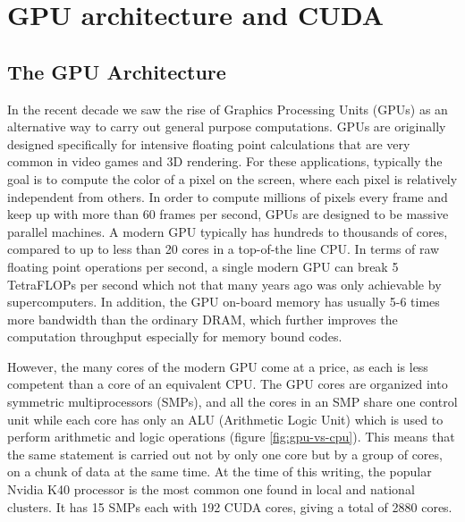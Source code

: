 
\chapter{GPU architecture and CUDA}
\label{app:gpu}


\section{The GPU Architecture}
\label{sec:gpu-arch}

In the recent decade we saw the rise of Graphics Processing Units (GPUs) as an
alternative way to carry out general purpose computations. GPUs are originally
designed specifically for intensive floating point calculations that are very
common in video games and 3D rendering. For these applications, typically the
goal is to compute the color of a pixel on the screen, where each pixel is
relatively independent from others. In order to compute millions of pixels every
frame and keep up with more than 60 frames per second, GPUs are designed to be
massive parallel machines. A modern GPU typically has hundreds to thousands of
cores, compared to up to less than 20 cores in a top-of-the line CPU. In terms
of raw floating point operations per second, a single modern GPU can break 5
TetraFLOPs per second which not that many years ago was only achievable by
supercomputers. In addition, the GPU on-board memory has usually 5-6 times more
bandwidth than the ordinary DRAM, which further improves the computation throughput
especially for memory bound codes.

However, the many cores of the modern GPU come at a price, as each is less
competent than a core of an equivalent CPU. The GPU cores are organized into
symmetric multiprocessors (SMPs), and all the cores in an SMP share one control
unit while each core has only an ALU (Arithmetic Logic Unit) which is used to
perform arithmetic and logic operations (figure \ref{fig:gpu-vs-cpu}). This
means that the same statement is carried out not by only one core but by a group
of cores, on a chunk of data at the same time. At the time of this writing, the
popular Nvidia K40 processor is the most common one found in local and national
clusters. It has 15 SMPs each with 192 CUDA cores, giving a total of 2880 cores.

